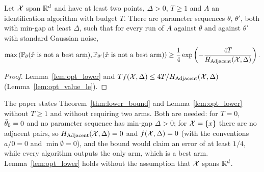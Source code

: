 \begin{theorem}
  \label{thm:lower_bound}
  \leanok
  Let $\mathcal{X}$ span $\mathbb{R}^d$ and have at least two points, $\Delta > 0$, $T \ge 1$ and $A$ an
  identification algorithm with budget $T$. There are parameter sequences $\theta$, $\theta'$, both
  with min-gap at least $\Delta$, such that for every run of $A$ against $\theta$ and against
  $\theta'$ with standard Gaussian noise,
  \[
    \max\left(\mathbb{P}_\theta(\hat x \text{ is not a best arm}),
      \mathbb{P}_{\theta'}(\hat x \text{ is not a best arm})\right)
    \ge \frac14 \exp\left(-\frac{4T}{H_{\mathrm{Adjacent}}(\mathcal{X}, \Delta)}\right).
  \]
\end{theorem}

\begin{proof}
  \leanok
  Lemma~\ref{lem:opt_lower} and $T f(\mathcal{X}, \Delta) \le 4T / H_{\mathrm{Adjacent}}(\mathcal{X}, \Delta)$
  (Lemma~\ref{lem:opt_value_le}).
\end{proof}

\begin{remark}
  \label{rem:lower_bound_degenerate}
  The paper states Theorem~\ref{thm:lower_bound} and Lemma~\ref{lem:opt_lower} without $T \ge 1$
  and without requiring two arms. Both are needed: for $T = 0$, $\bar{\theta}_0 = 0$ and no parameter
  sequence has min-gap $\Delta > 0$; for $\mathcal{X} = \{x\}$ there are no adjacent pairs, so
  $H_{\mathrm{Adjacent}}(\mathcal{X}, \Delta) = 0$ and $f(\mathcal{X}, \Delta) = 0$ (with the conventions $a / 0 = 0$ and
  $\min \emptyset = 0$), and the bound would claim an error of at least $1/4$, while every algorithm
  outputs the only arm, which is a best arm. Lemma~\ref{lem:opt_lower} holds without the assumption
  that $\mathcal{X}$ spans $\mathbb{R}^d$.
\end{remark}
